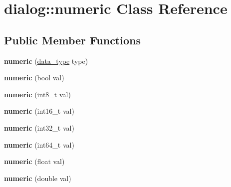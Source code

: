 \hypertarget{classdialog_1_1numeric}{}\section{dialog\+:\+:numeric Class Reference}
\label{classdialog_1_1numeric}
\subsection*{Public Member Functions}
\begin{DoxyCompactItemize}
\item 
\mbox{\label{classdialog_1_1numeric_ac863b06cd354cec5cd2d67e83ed147b0}} 
{\bfseries numeric} (\hyperlink{structdialog_1_1data__type}{data\+\_\+type} type)
\item 
\mbox{\label{classdialog_1_1numeric_ac932a334ea3d0147b4a787704c7cee3b}} 
{\bfseries numeric} (bool val)
\item 
\mbox{\label{classdialog_1_1numeric_a350fa2e5d65a75a6d0dd7df3bb095d3d}} 
{\bfseries numeric} (int8\+\_\+t val)
\item 
\mbox{\label{classdialog_1_1numeric_ac3e90d058ca9481bb57f4cbeef75374f}} 
{\bfseries numeric} (int16\+\_\+t val)
\item 
\mbox{\label{classdialog_1_1numeric_a522d481eb1e2403a80c3b950a10c5b0d}} 
{\bfseries numeric} (int32\+\_\+t val)
\item 
\mbox{\label{classdialog_1_1numeric_af74e9daadcfb8cd40315a863e1220947}} 
{\bfseries numeric} (int64\+\_\+t val)
\item 
\mbox{\label{classdialog_1_1numeric_a73a23576e3a1523847b729e29a641d6d}} 
{\bfseries numeric} (float val)
\item 
\mbox{\label{classdialog_1_1numeric_a48138c620893637ee22dd125049af5da}} 
{\bfseries numeric} (double val)
\item 
\mbox{\label{classdialog_1_1numeric_ad29aee52c6db72a3a83e59029a5d9d33}} 

\end{DoxyCompactItemize}
